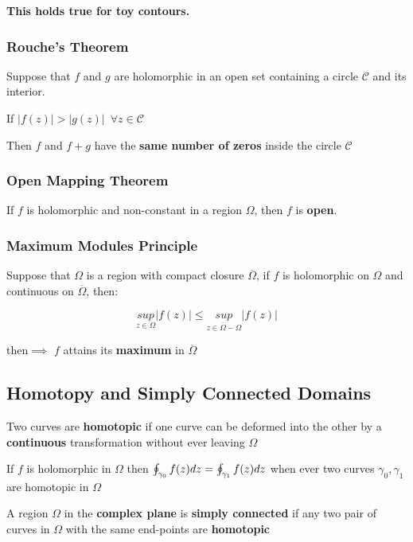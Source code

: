 \documentclass[11pt]{article}
\begin{document}
\textbf{This holds true for toy contours.}

    \subsubsection{Rouche's Theorem}\label{rouches-theorem}

Suppose that \(f\) and \(g\) are holomorphic in an open set containing a
circle \(\mathcal{C}\) and its interior.

If \(|f(z)|>|g(z)|\,\,\, \forall z\in \mathcal{C}\)

Then \(f\) and \(f+g\) have the \textbf{same number of zeros} inside the
circle \(\mathcal{C}\)

    \subsubsection{Open Mapping Theorem}\label{open-mapping-theorem}

If \(f\) is holomorphic and non-constant in a region \(\Omega\), then
\(f\) is \textbf{open}.

    \subsubsection{Maximum Modules
Principle}\label{maximum-modules-principle}

Suppose that \(\Omega\) is a region with compact closure
\(\overline{\Omega}\), if \(f\) is holomorphic on \(\Omega\) and
continuous on \(\overline{\Omega}\), then:

\[\underset{z\in\Omega}{sup}|f(z)|\le\underset{z\in\overline{\Omega}-\Omega}{sup}|f(z)|\]

then\(\implies\) \(f\) attains its \textbf{maximum} in
\(\overline{\Omega}\)

    \subsection{Homotopy and Simply Connected
Domains}\label{homotopy-and-simply-connected-domains}

Two curves are \textbf{homotopic} if one curve can be deformed into the
other by a \textbf{continuous} transformation without ever leaving
\(\Omega\)

If \(f\) is holomorphic in \(\Omega\) then
\(\Large\oint_{\gamma_{0}}f(z)dz = \oint_{\gamma_{1}}f(z)dz\) when ever
two curves \(\gamma_{0},\gamma_{1}\) are homotopic in \(\Omega\)

A region \(\Omega\) in the \textbf{complex plane} is \textbf{simply
connected} if any two pair of curves in \(\Omega\) with the same
end-points are \textbf{homotopic}
\end{document}

